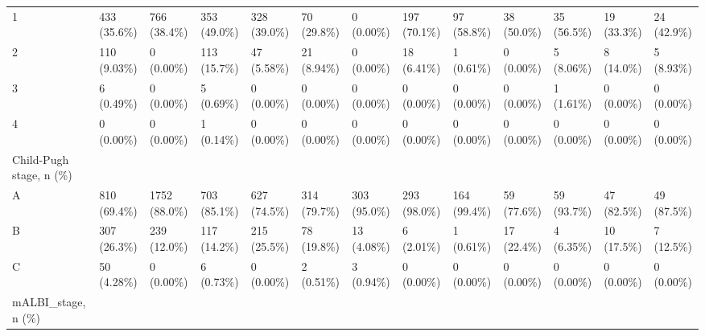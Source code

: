 \begin{landscape}
\begin{center}
\begin{longtable}{p{6.0cm}p{3.0cm}p{3.0cm}p{3.0cm}p{3.0cm}p{3.0cm}p{3.0cm}p{3.0cm}p{3.0cm}p{3.0cm}p{3.0cm}p{3.0cm}p{3.0cm}}
    1 &   433 (35.6\%)    &   766 (38.4\%)    &   353 (49.0\%)    &   328 (39.0\%)    &    70 (29.8\%)    &    0 (0.00\%)     &   197 (70.1\%)    &    97 (58.8\%)    &    38 (50.0\%)    &    35 (56.5\%)    &    19 (33.3\%)    &    24 (42.9\%)    \\
    2 &   110 (9.03\%)    &    0 (0.00\%)     &   113 (15.7\%)    &    47 (5.58\%)    &    21 (8.94\%)    &    0 (0.00\%)     &    18 (6.41\%)    &    1 (0.61\%)     &    0 (0.00\%)     &    5 (8.06\%)     &    8 (14.0\%)     &    5 (8.93\%)     \\
    3 &    6 (0.49\%)     &    0 (0.00\%)     &    5 (0.69\%)     &    0 (0.00\%)     &    0 (0.00\%)     &    0 (0.00\%)     &    0 (0.00\%)     &    0 (0.00\%)     &    0 (0.00\%)     &    1 (1.61\%)     &    0 (0.00\%)     &    0 (0.00\%)     \\
    4 &    0 (0.00\%)     &    0 (0.00\%)     &    1 (0.14\%)     &    0 (0.00\%)     &    0 (0.00\%)     &    0 (0.00\%)     &    0 (0.00\%)     &    0 (0.00\%)     &    0 (0.00\%)     &    0 (0.00\%)     &    0 (0.00\%)     &    0 (0.00\%)     \\
Child-Pugh stage, n (\%) &                  &                  &                  &                  &                  &                  &                  &                  &                  &                  &                  &                  \\
    A &   810 (69.4\%)    &   1752 (88.0\%)   &   703 (85.1\%)    &   627 (74.5\%)    &   314 (79.7\%)    &   303 (95.0\%)    &   293 (98.0\%)    &   164 (99.4\%)    &    59 (77.6\%)    &    59 (93.7\%)    &    47 (82.5\%)    &    49 (87.5\%)    \\
    B &   307 (26.3\%)    &   239 (12.0\%)    &   117 (14.2\%)    &   215 (25.5\%)    &    78 (19.8\%)    &    13 (4.08\%)    &    6 (2.01\%)     &    1 (0.61\%)     &    17 (22.4\%)    &    4 (6.35\%)     &    10 (17.5\%)    &    7 (12.5\%)     \\
    C &    50 (4.28\%)    &    0 (0.00\%)     &    6 (0.73\%)     &    0 (0.00\%)     &    2 (0.51\%)     &    3 (0.94\%)     &    0 (0.00\%)     &    0 (0.00\%)     &    0 (0.00\%)     &    0 (0.00\%)     &    0 (0.00\%)     &    0 (0.00\%)     \\
mALBI\_stage, n (\%) &                  &                  &                  &                  &                  &                  &                  &                  &                  &                  &                  &                  \\

\end{longtable}
\end{center}
\end{landscape}
